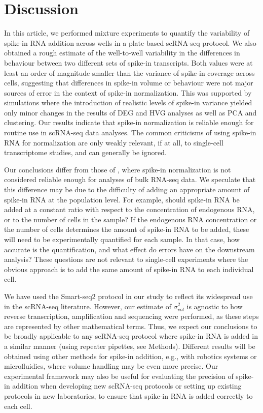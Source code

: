 \documentclass{article}
\begin{document}
\section*{Discussion}
In this article, we performed mixture experiments to quantify the variability of spike-in RNA addition across wells in a plate-based scRNA-seq protocol.
We also obtained a rough estimate of the well-to-well variability in the differences in behaviour between two different sets of spike-in transcripts.
Both values were at least an order of magnitude smaller than the variance of spike-in coverage across cells, suggesting that differences in spike-in volume or behaviour were not major sources of error in the context of spike-in normalization.
This was supported by simulations where the introduction of realistic levels of spike-in variance yielded only minor changes in the results of DEG and HVG analyses as well as PCA and clustering.
Our results indicate that spike-in normalization is reliable enough for routine use in scRNA-seq data analyses.
The common criticisms of using spike-in RNA for normalization are only weakly relevant, if at all, to single-cell transcriptome studies, and can generally be ignored.

Our conclusions differ from those of \cite{risso2014normalization}, where spike-in normalization is not considered reliable enough for analyses of bulk RNA-seq data.
We speculate that this difference may be due to the difficulty of adding an appropriate amount of spike-in RNA at the population level.
For example, should spike-in RNA be added at a constant ratio with respect to the concentration of endogenous RNA, or to the number of cells in the sample?
If the endogenous RNA concentration or the number of cells determines the amount of spike-in RNA to be added, these will need to be experimentally quantified for each sample.
In that case, how accurate is the quantification, and what effect do errors have on the downstream analysis?
These questions are not relevant to single-cell experiments where the obvious approach is to add the same amount of spike-in RNA to each individual cell.

We have used the Smart-seq2 protocol in our study to reflect its widespread use in the scRNA-seq literature.
However, our estimate of $\sigma^2_{vol}$ is agnostic to how reverse transcription, amplification and sequencing were performed, as these steps are represented by other mathematical terms.
Thus, we expect our conclusions to be broadly applicable to any scRNA-seq protocol where spike-in RNA is added in a similar manner (using repeater pipettes, see Methods).
Different results will be obtained using other methods for spike-in addition, e.g., with robotics systems or microfluidics, where volume handling may be even more precise.
Our experimental framework may also be useful for evaluating the precision of spike-in addition when developing new scRNA-seq protocols or setting up existing protocols in new laboratories, to ensure that spike-in RNA is added correctly to each cell.
\end{document}

